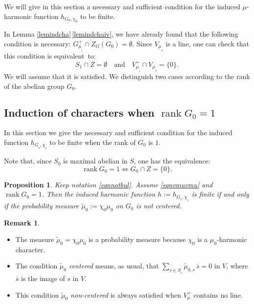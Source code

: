 \documentclass[JEP,XML,SOM,Unicode]{cedram}
\DeclareMathOperator{\rank}{rank}
\newtheorem{Prop}[Thm]{Proposition}
\theoremstyle{definition}
\newtheorem{Rem}[Thm]{Remark}
\let\ol\overline
\let\bq\relax
\let\eq\relax
\begin{document}
We will give in this section a
necessary and sufficient condition
for the induced $\mu$-harmonic function $h_{G_0,\chi_0}$
to be finite.

In Lemma \ref{lemindcha}\,\eqref{lemindchaiv}, we have already found that the following condition
is necessary: $G_{\mu_{_1}}^+\cap Z_G(G_0)=\emptyset$.
Since $V_{\mu_{_0}}$ is a line, one can check that this condition is equivalent~to:
\begin{equation}
\label{eqnvmuvmu}
S_1\cap Z=\emptyset
\quad\text{and}\quad
V^+_{\mu_{_1}}\cap V_{\mu_{_0}}=\{0\}.
\end{equation}
We will assume that it is satisfied. We distinguish two cases according to the rank of the abelian group $G_0$.

\subsection{Induction of characters when $\rank G_0=1$}
\label{secindhar1}
\bq
In this section we give the necessary and sufficient condition for
the induced function $h_{G_{_0},\chi_{_0}}$ to be finite when the rank of $G_0$ is $1$.
\eq

Note that, since $S_0$ is maximal abelian in $S$,
one has the equivalence:
\[
\rank G_0=1\Longleftrightarrow G_0\cap Z=\{0\}.
\]

\begin{Prop}
\label{proindra1}
Keep notation \eqref{eqnnotbul}. Assume \eqref{eqnvmuvmu} and $\rank G_0=1$.
Then the induced harmonic function $h:=h_{G_{_0},\chi_{_0}}$ is finite if and only if
the probability measure $\widetilde{\mu}_0:=\chi_0\mu_0$ on $G_0$ is not centered.
\end{Prop}

\skpt
\begin{Rem}
\begin{itemize}
\item
The measure $\widetilde{\mu}_0=\chi_0\mu_0$ is a probability measure because
$\chi_0$ is a $\mu_0$-harmonic character.
\item
The condition {\it $\widetilde{\mu}_0$ centered} means, as usual, that
$\sum_{s\in S_{_0}}\widetilde{\mu}_{0,s}\, \ol s =0$ in $V$,
where $\ol{s}$ is the image of $s$ in $V$.
\item
This condition {\it $\widetilde{\mu}_0$ non-centered} is always satisfied
when $V_\mu^+$ contains no line.
\end{itemize}
\end{Rem}
\end{document}
